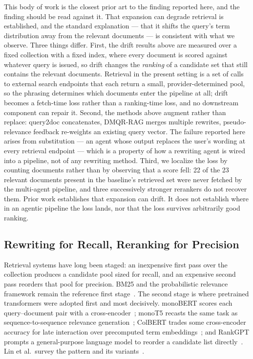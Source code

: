 \documentclass[acmsmall,review,anonymous,screen]{acmart}
\begin{document}
This body of work is the closest prior art to the finding reported here, and the
finding should be read against it. That expansion can degrade retrieval is
established, and the standard explanation --- that it shifts the query's term
distribution away from the relevant documents --- is consistent with what we
observe. Three things differ. First, the drift results above are measured over a
fixed collection with a fixed index, where every document is scored against
whatever query is issued, so drift changes the \emph{ranking} of a candidate set
that still contains the relevant documents. Retrieval in the present setting is a
set of calls to external search endpoints that each return a small,
provider-determined pool, so the phrasing determines which documents enter the
pipeline at all; drift becomes a fetch-time loss rather than a ranking-time loss,
and no downstream component can repair it. Second, the methods above augment
rather than replace: query2doc concatenates, DMQR-RAG merges multiple rewrites,
pseudo-relevance feedback re-weights an existing query vector. The failure
reported here arises from substitution --- an agent whose output replaces the
user's wording at every retrieval endpoint --- which is a property of how a
rewriting agent is wired into a pipeline, not of any rewriting method. Third, we
localize the loss by counting documents rather than by observing that a score
fell: 22 of the 23 relevant documents present in the baseline's retrieved set
were never fetched by the multi-agent pipeline, and three successively stronger
rerankers do not recover them. Prior work establishes that expansion can drift.
It does not establish where in an agentic pipeline the loss lands, nor that the
loss survives arbitrarily good ranking.

\subsection{Rewriting for Recall, Reranking for Precision}

Retrieval systems have long been staged: an inexpensive first pass over the
collection produces a candidate pool sized for recall, and an expensive second
pass reorders that pool for precision. BM25 and the probabilistic relevance
framework remain the reference first stage~\cite{robertson2009bm25}. The second
stage is where pretrained transformers were adopted first and most decisively.
monoBERT scores each query--document pair with a
cross-encoder~\cite{nogueira2019monobert}; monoT5 recasts the same task as
sequence-to-sequence relevance generation~\cite{nogueira2020monot5}; ColBERT
trades some cross-encoder accuracy for late interaction over precomputed term
embeddings~\cite{khattab2020colbert}; and RankGPT prompts a general-purpose
language model to reorder a candidate list
directly~\cite{sun2023rankgpt}. Lin et al.\ survey the pattern and its
variants~\cite{lin2021pretrained}.
\end{document}
